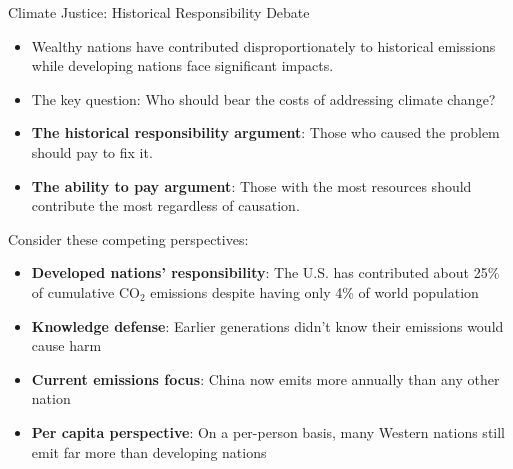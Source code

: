 \documentclass{beamer}
\begin{document}
	\begin{frame}{Climate Justice: Historical Responsibility Debate}
		\begin{itemize}
			\item Wealthy nations have contributed disproportionately to historical emissions while developing nations face significant impacts.
			\item The key question: Who should bear the costs of addressing climate change?
			\item \textbf{The historical responsibility argument}: Those who caused the problem should pay to fix it.
			\item \textbf{The ability to pay argument}: Those with the most resources should contribute the most regardless of causation.
		\end{itemize}
		
		\begin{example}
			\scriptsize
			Consider these competing perspectives:
			\begin{itemize}
				\item \textbf{Developed nations' responsibility}: The U.S. has contributed about 25\% of cumulative CO$_2$ emissions despite having only 4\% of world population
				\item \textbf{Knowledge defense}: Earlier generations didn't know their emissions would cause harm
				\item \textbf{Current emissions focus}: China now emits more annually than any other nation
				\item \textbf{Per capita perspective}: On a per-person basis, many Western nations still emit far more than developing nations
			\end{itemize}
		\end{example}
	\end{frame}
	
\end{document}
